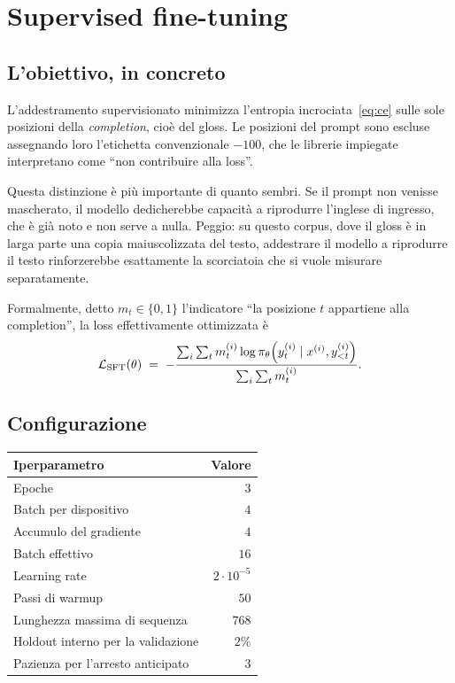 \chapter{Supervised fine-tuning}
\label{cap:sft}

\section{L'obiettivo, in concreto}

L'addestramento supervisionato minimizza l'entropia incrociata~\eqref{eq:ce}
sulle sole posizioni della \emph{completion}, cioè del gloss. Le posizioni del
prompt sono escluse assegnando loro l'etichetta convenzionale $-100$, che le
librerie impiegate interpretano come ``non contribuire alla loss''.

Questa distinzione è più importante di quanto sembri. Se il prompt non venisse
mascherato, il modello dedicherebbe capacità a riprodurre l'inglese di ingresso,
che è già noto e non serve a nulla. Peggio: su questo corpus, dove il gloss è in
larga parte una copia maiuscolizzata del testo, addestrare il modello a
riprodurre il testo rinforzerebbe esattamente la scorciatoia che si vuole
misurare separatamente.

Formalmente, detto $m_t \in \{0,1\}$ l'indicatore ``la posizione $t$ appartiene
alla completion'', la loss effettivamente ottimizzata è
\begin{equation}
  \label{eq:sft-loss}
  \mathcal{L}_{\text{SFT}}(\theta)
  \;=\;
  -\frac{\sum_{i}\sum_{t} m^{(i)}_t
         \log \pi_\theta\!\left(y^{(i)}_t \mid x^{(i)}, y^{(i)}_{<t}\right)}
        {\sum_{i}\sum_{t} m^{(i)}_t}.
\end{equation}

\section{Configurazione}

\begin{center}
\begin{tabular}{lr}
\toprule
Iperparametro & Valore \\
\midrule
Epoche & $3$ \\
Batch per dispositivo & $4$ \\
Accumulo del gradiente & $4$ \\
Batch effettivo & $16$ \\
Learning rate & $2 \cdot 10^{-5}$ \\
Passi di warmup & $50$ \\
Lunghezza massima di sequenza & $768$ \\
Holdout interno per la validazione & $2\%$ \\
Pazienza per l'arresto anticipato & $3$ \\
\bottomrule
\end{tabular}
\end{center}

